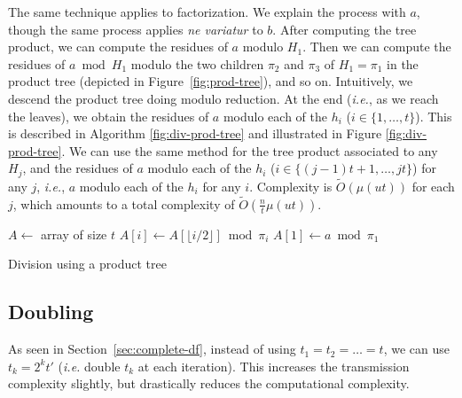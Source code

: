 \documentclass[11pt]{llncs}
\newcommand{\Oapp}{\ensuremath{\tilde{O}}}
\newcommand{\ie}{\textit{i.e.}\xspace}
\begin{document}
The same technique applies to factorization. We explain the process with $a$, though the same process applies \textit{ne variatur} to $b$.
After computing the tree product, we can compute the residues of $a$ modulo $H_1$.
Then we can compute the residues of $a \bmod{H_1}$ modulo the two children $\pi_2$ and $\pi_3$ of $H_1 = \pi_1$ in the product tree (depicted in Figure~\ref{fig:prod-tree}), and so on. Intuitively, we descend the product tree doing modulo reduction. At the end (\ie, as we reach the leaves), we obtain the residues of $a$ modulo each of the $h_i$ ($i \in \{1,\dots,t\}$). This is described in Algorithm \ref{fig:div-prod-tree} and illustrated in Figure \ref{fig:div-prod-tree}.
We can use the same method for the tree product associated to any $H_j$, and the residues of $a$ modulo each of the $h_i$ ($i \in \{(j-1)t+1,\dots,jt\}$) for any $j$, \ie, $a$ modulo each of the $h_i$ for any $i$. Complexity is $\Oapp(\mu(u t))$ for each $j$, which amounts to a total complexity of $\Oapp(\frac{n}{t} \mu(u t))$.

\begin{algorithm}
\newcommand{\vstart}{\ensuremath{\mathrm{start}}}
\newcommand{\vmid}{\ensuremath{\mathrm{mid}}}
\newcommand{\vend}{\ensuremath{\mathrm{end}}}
\begin{algorithmic}[1]
\State $A \gets $ array of size $t$
    \State $A[i] \gets A[\lfloor i/2 \rfloor] \bmod \pi_i$
    \State {}
    \State {}
  \EndIf
\EndFunction
\State $A[1] \gets a \bmod \pi_1$
\State {}
\State {}
\end{algorithmic}
\caption{Division using a product tree}
\label{alg:div-prod-tree}
\end{algorithm}

\subsection{Doubling}
\label{sec:doubling}

As seen in Section~\ref{sec:complete-df}, instead of using $t_1 = t_2 = \dots = t$, we can use $t_k = 2^k t'$ (\ie double $t_k$ at each iteration).
This increases the transmission complexity slightly, but drastically reduces the computational complexity.
\end{document}
